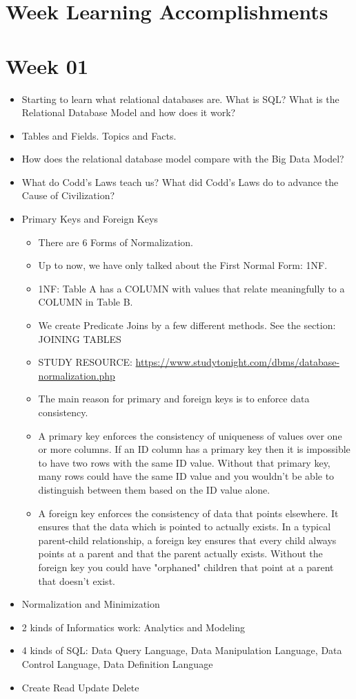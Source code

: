 \section {Week Learning Accomplishments}

\section  {Week 01}			

\begin{itemize}
\item Starting to learn what relational databases are. What is SQL? What is the Relational Database Model and how does it work?
\item Tables and Fields. Topics and Facts.
\item How does the relational database model compare with the Big Data Model?
\item What do Codd's Laws teach us? What did Codd's Laws do to advance the Cause of Civilization?
\item Primary Keys and Foreign Keys
\begin{itemize}
\item There are 6 Forms of Normalization.
\item Up to now, we have only talked about the First Normal Form: 1NF.
\item 1NF: Table A has a COLUMN with values that relate meaningfully to a COLUMN in Table B.
\item We create Predicate Joins by a few different methods. See the section: JOINING TABLES 
\item STUDY RESOURCE: \url{https://www.studytonight.com/dbms/database-normalization.php}
\end{itemize}

\begin{itemize}
\item The main reason for primary and foreign keys is to enforce data consistency.
\item A primary key enforces the consistency of uniqueness of values over one or more columns. If an ID column has a primary key then it is impossible to have two rows with the same ID value. Without that primary key, many rows could have the same ID value and you wouldn't be able to distinguish between them based on the ID value alone.
\item A foreign key enforces the consistency of data that points elsewhere. It ensures that the data which is pointed to actually exists. In a typical parent-child relationship, a foreign key ensures that every child always points at a parent and that the parent actually exists. Without the foreign key you could have "orphaned" children that point at a parent that doesn't exist.
\end{itemize}
\item Normalization and Minimization
\item 2 kinds of Informatics work: Analytics and Modeling
\item 4 kinds of SQL: Data Query Language, Data Manipulation Language, Data Control Language, Data Definition Language
\item Create Read Update Delete
\end{itemize}

